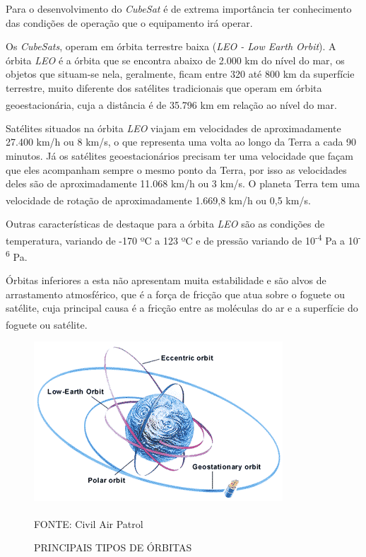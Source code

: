 \documentclass[
	12pt,				%
	openright,			%
	oneside,			%
	a4paper,			%
	english,			%
	french,				%
	spanish,			%
	brazil,				%
	oldfontcommands
	]{abntex2}
\begin{document}
	Para o desenvolvimento do \textit{CubeSat} é de extrema importância ter conhecimento das condições de operação que o equipamento irá operar.
	
	Os \textit{CubeSats}, operam em órbita terrestre baixa (\textit{LEO - Low Earth Orbit}). A órbita \textit{LEO} é a órbita que se encontra abaixo de 2.000 km do nível do mar, os objetos que situam-se nela, geralmente, ficam entre 320 até 800 km da superfície terrestre, muito diferente dos satélites tradicionais que operam em órbita geoestacionária, cuja a distância é de 35.796 km em relação ao nível do mar.\textsuperscript{\cite{LEO}}\textsuperscript{\cite{GEO}}
	
	Satélites situados na órbita \textit{LEO} viajam em velocidades de aproximadamente 27.400 km/h ou 8 km/s, o que representa uma volta ao longo da Terra a cada 90 minutos. Já os satélites geoestacionários precisam ter uma velocidade que façam que eles acompanham sempre o mesmo ponto da Terra, por isso as velocidades deles são de aproximadamente 11.068 km/h ou 3 km/s. O planeta Terra tem uma velocidade de rotação de aproximadamente 1.669,8 km/h ou 0,5 km/s.\textsuperscript{\cite{LEO}}\textsuperscript{\cite{GEO}}
	
	Outras características de destaque para a órbita \textit{LEO} são as condições de temperatura, variando de -170 ºC a 123 ºC e de pressão variando de 10\textsuperscript{-4} Pa a 10\textsuperscript{-6} Pa.\textsuperscript{\cite{LEO}}
	
	Órbitas inferiores a esta não apresentam muita estabilidade e são alvos de arrastamento atmosférico, que é a força de fricção que atua sobre o foguete ou satélite, cuja principal causa é a fricção entre as moléculas do ar e a superfície do foguete ou satélite.\textsuperscript{\cite{NASA2}}
	
	\begin{figure}[th]
		\caption{PRINCIPAIS TIPOS DE ÓRBITAS}
		\label{Fig_Orbitas}
		\centering
		\includegraphics[width=0.65\linewidth]{./figs/cubesat_03}
			
		\begin{small}
			FONTE: Civil Air Patrol\textsuperscript{\cite{CAP}}
		\end{small}		
	\end{figure}
	
\end{document}
